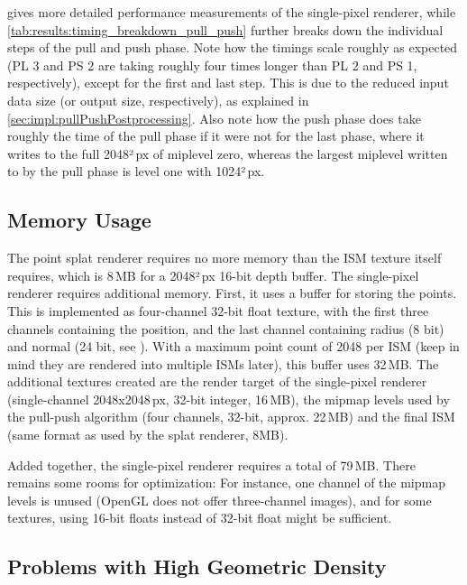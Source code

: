  gives more detailed performance measurements of the single-pixel renderer, while \cref{tab:results:timing_breakdown_pull_push} further breaks down the individual steps of the pull and push phase. Note how the timings scale roughly as expected (PL 3 and PS 2 are taking roughly four times longer than PL 2 and PS 1, respectively), except for the first and last step. This is due to the reduced input data size (or output size, respectively), as explained in \cref{sec:impl:pullPushPostprocessing}. Also note how the push phase does take roughly the time of the pull phase if it were not for the last phase, where it writes to the full 2048²\,px of miplevel zero, whereas the largest miplevel written to by the pull phase is level one with 1024²\,px.



\subsection{Memory Usage}
\label{sec:results:ism:memory}

The point splat renderer requires no more memory than the ISM texture itself requires, which is 8\,MB for a 2048²\,px 16-bit depth buffer. The single-pixel renderer requires additional memory. First, it uses a buffer for storing the points. This is implemented as four-channel 32-bit float texture, with the first three channels containing the position, and the last channel containing radius (8 bit) and normal (24 bit, see \cite{Cigolle:2014:NormalPacking}). With a maximum point count of 2048 per ISM (keep in mind they are rendered into multiple ISMs later), this buffer uses 32\,MB.
The additional textures created are the render target of the single-pixel renderer (single-channel 2048x2048\,px, 32-bit integer, 16\,MB), the mipmap levels used by the pull-push algorithm (four channels, 32-bit, approx. 22\,MB) and the final ISM (same format as used by the splat renderer, 8MB).

Added together, the single-pixel renderer requires a total of 79\,MB. There remains some rooms for optimization: For instance, one channel of the mipmap levels is unused (OpenGL does not offer three-channel images), and for some textures, using 16-bit floats instead of 32-bit float might be sufficient.


\subsection{Problems with High Geometric Density}
\label{sec:results:ism:densityProblems}

